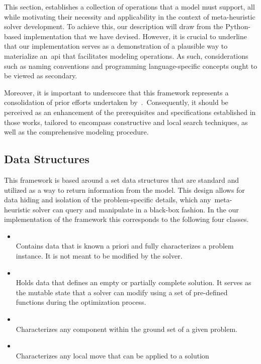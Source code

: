 This section, establishes a collection of operations that a model must
support, all while motivating their necessity and applicability in the
context of meta-heuristic solver development. To achieve this, our description
will draw from the Python-based implementation that we have devised. However, it is
crucial to underline that our implementation serves as a demonstration of a
plausible way to materialize an~\acrshort{api} that facilitates modeling
operations. As such, considerations such as naming conventions and programming
language-specific concepts ought to be viewed as secondary.

Moreover, it is important to underscore that this framework represents a
consolidation of prior efforts undertaken by~\citet{vieira2009uma,
  fonseca2021nasf4nio, outeiro2021application}.~Consequently, it should be
perceived as an enhancement of the prerequisites and specifications established
in those works, tailored to encompass constructive and local search techniques,
as well as the comprehensive modeling procedure.

\subsection{Data Structures}

This framework is based around a set data structures that are standard and
utilized as a way to return information from the model. This design allows for
data hiding and isolation of the problem-specific details, which
any~\acrshort{meta-heuristic} solver can query and manipulate in a black-box
fashion. In the our implementation of the framework this corresponds to the
following four classes.

\begin{itemize}
  \item {}\\
        Contains data that is known a priori and fully characterizes
        a problem instance. It is not meant to be modified by the solver.

  \item {}\\
        Holds data that defines an empty or partially
        complete solution. It serves as the mutable state that a solver
        can modify using a set of pre-defined functions during the optimization
        process.

  \item {}\\
        Characterizes any component within the ground set of a given problem.

  \item {}\\
        Characterizes any local move that can be applied to a solution
\end{itemize}

